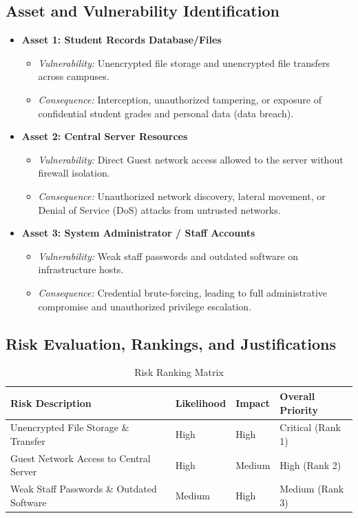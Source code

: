 \documentclass[11pt,a4paper]{article}
\begin{document}
\subsection{Asset and Vulnerability Identification}
\begin{itemize}
    \item \textbf{Asset 1: Student Records Database/Files}
    \begin{itemize}
        \item \textit{Vulnerability:} Unencrypted file storage and unencrypted file transfers across campuses.
        \item \textit{Consequence:} Interception, unauthorized tampering, or exposure of confidential student grades and personal data (data breach).
    \end{itemize}
    \item \textbf{Asset 2: Central Server Resources}
    \begin{itemize}
        \item \textit{Vulnerability:} Direct Guest network access allowed to the server without firewall isolation.
        \item \textit{Consequence:} Unauthorized network discovery, lateral movement, or Denial of Service (DoS) attacks from untrusted networks.
    \end{itemize}
    \item \textbf{Asset 3: System Administrator / Staff Accounts}
    \begin{itemize}
        \item \textit{Vulnerability:} Weak staff passwords and outdated software on infrastructure hosts.
        \item \textit{Consequence:} Credential brute-forcing, leading to full administrative compromise and unauthorized privilege escalation.
    \end{itemize}
\end{itemize}

\subsection{Risk Evaluation, Rankings, and Justifications}
\begin{table}[h!]
\centering
\begin{tabular}{@{}llll@{}}
\toprule
\textbf{Risk Description} & \textbf{Likelihood} & \textbf{Impact} & \textbf{Overall Priority} \\ \midrule
Unencrypted File Storage \& Transfer & High & High & Critical (Rank 1) \\
Guest Network Access to Central Server & High & Medium & High (Rank 2) \\
Weak Staff Passwords \& Outdated Software & Medium & High & Medium (Rank 3) \\ \bottomrule
\end{tabular}
\caption{Risk Ranking Matrix}
\end{table}
\end{document}
